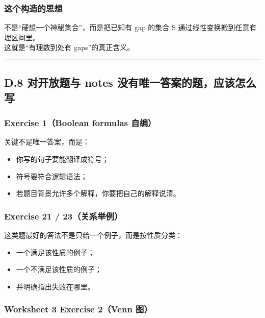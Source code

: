 \documentclass[
  11pt,
]{article}
\providecommand{\tightlist}{%
  \setlength{\itemsep}{0pt}\setlength{\parskip}{0pt}}
\begin{document}
\subsubsection{这个构造的思想}\label{ux8fd9ux4e2aux6784ux9020ux7684ux601dux60f3}

不是``硬想一个神秘集合''，而是把已知有 gap 的集合 S
通过线性变换搬到任意有理区间里。\\
这就是``有理数到处有 gaps''的真正含义。

\begin{center}\rule{0.5\linewidth}{0.5pt}\end{center}

\subsection{D.8 对开放题与 notes
没有唯一答案的题，应该怎么写}\label{d.8-ux5bf9ux5f00ux653eux9898ux4e0e-notes-ux6ca1ux6709ux552fux4e00ux7b54ux6848ux7684ux9898ux5e94ux8be5ux600eux4e48ux5199}

\subsubsection{Exercise 1（Boolean formulas
自编）}\label{exercise-1boolean-formulas-ux81eaux7f16}

关键不是唯一答案，而是：

\begin{itemize}
\tightlist
\item
  你写的句子要能翻译成符号；
\item
  符号要符合逻辑语法；
\item
  若题目背景允许多个解释，你要把自己的解释说清。
\end{itemize}

\subsubsection{Exercise 21 /
23（关系举例）}\label{exercise-21-23ux5173ux7cfbux4e3eux4f8b}

这类题最好的答法不是只给一个例子，而是按性质分类：

\begin{itemize}
\tightlist
\item
  一个满足该性质的例子；
\item
  一个不满足该性质的例子；
\item
  并明确指出失败在哪里。
\end{itemize}

\subsubsection{Worksheet 3 Exercise 2（Venn
图）}\label{worksheet-3-exercise-2venn-ux56fe}
\end{document}
